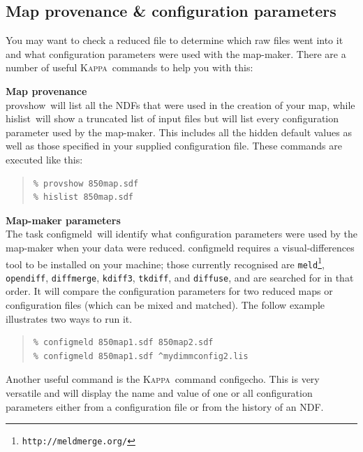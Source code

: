 \documentclass[twoside,11pt]{article}
\newcommand{\htmladdnormallink}[2]{#1}
\newcommand{\latex}[1]{#1}
\newcommand{\xref}[3]{#1}
\newcommand{\xlabel}[1]{}
\renewcommand{\_}{\texttt{\symbol{95}}}
\newenvironment{myquote}{\begin{quote}\begin{small}}{\end{small}\end{quote}}
\newcommand{\Kappa}{\xref{\textsc{Kappa}}{sun95}{}}
\newcommand{\task}[1]{\textsf{#1}}
\newcommand{\configmeld}{\xref{\task{configmeld}}{sun258}{CONFIGMELD}}
\newcommand{\configecho}{\xref{\task{configecho}}{sun95}{CONFIGECHO}}
\newcommand{\hislist}{\xref{\task{hislist}}{sun95}{HISLIST}}
\newcommand{\provshow}{\xref{\task{provshow}}{sun95}{PROVSHOW}}
\begin{document}
\subsection{\xlabel{provenance}Map provenance \& configuration parameters}
\label{sec:prov}

You may want to check a reduced file to determine which raw files went
into it and what configuration parameters were used with the
map-maker. There are a number of useful \Kappa\ commands to help you
with this:

\textbf{Map provenance}\\
\provshow\ will list all the NDFs that were used in the creation of
your map, while \hislist\ will show a truncated list of input files
but will list every configuration parameter used by the map-maker.
This includes all the hidden default values as well as those specified
in your supplied configuration file. These commands are executed like
this:
\begin{myquote}
\begin{verbatim}
% provshow 850map.sdf
% hislist 850map.sdf
\end{verbatim}
\end{myquote}

\textbf{Map-maker parameters}\\
The task \configmeld\ will identify what configuration parameters were
used by the map-maker when your data were reduced. \task{configmeld}
requires a visual-differences tool to be installed on your machine;
those currently recognised are
\htmladdnormallink{\texttt{meld}}{http://meldmerge.org/}\latex{\footnote{\texttt{http://meldmerge.org/}}},
\htmladdnormallink{\texttt{opendiff}}{http://developer.apple.com/},
\htmladdnormallink{\texttt{diffmerge}}{http://www.sourcegear.com/diffmerge},
\htmladdnormallink{\texttt{kdiff3}}{http://kdiff3.sourceforge.net},
\htmladdnormallink{\texttt{tkdiff}}{http://sourceforge.net/projects/tkdiff}, and
\htmladdnormallink{\texttt{diffuse}}{http://diffuse.sourceforge.net},
and are searched for in that order. It will compare the
configuration parameters for two reduced maps or configuration files
(which can be mixed and matched). The follow example illustrates two
ways to run it.

\begin{myquote}
\begin{verbatim}
% configmeld 850map1.sdf 850map2.sdf
% configmeld 850map1.sdf ^mydimmconfig2.lis
\end{verbatim}
\end{myquote}
Another useful command is the \Kappa\ command \configecho.
This is very versatile and will display the name and value of one or
all configuration parameters either from a configuration file or from
the history of an NDF.
\end{document}
